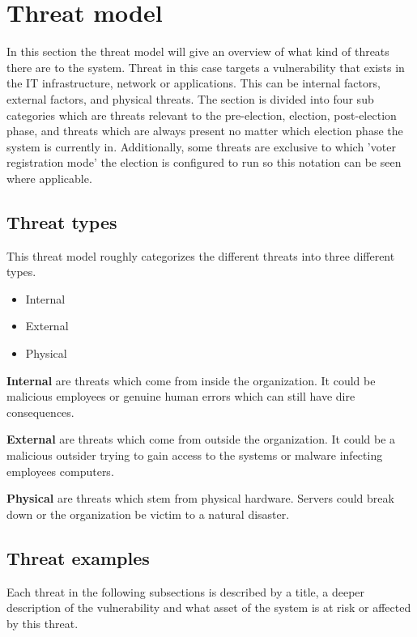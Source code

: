 \section{Threat model}
In this section the threat model will give an overview of what kind of threats there are to the system. Threat in this case targets a vulnerability that exists in the IT infrastructure, network or applications. This can be internal factors, external factors, and physical threats. The section is divided into four sub categories which are threats relevant to the pre-election, election, post-election phase, and threats which are always present no matter which election phase the system is currently in. Additionally, some threats are exclusive to which 'voter registration mode' the election is configured to run so this notation can be seen where applicable. 

\subsection{Threat types}
This threat model roughly categorizes the different threats into three different types.

\begin{itemize}
    \item Internal
    \item External
    \item Physical
\end{itemize}

\textbf{Internal} are threats which come from inside the organization. It could be malicious employees or genuine human errors which can still have dire consequences.

\textbf{External} are threats which come from outside the organization. It could be a malicious outsider trying to gain access to the systems or malware infecting employees computers.

\textbf{Physical} are threats which stem from physical hardware. Servers could break down or the organization be victim to a natural disaster.


\subsection{Threat examples}

Each threat in the following subsections is described by a title, a deeper description of the vulnerability and what asset of the system is at risk or affected by this threat.

